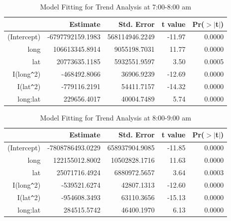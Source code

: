 \documentclass[hidelinks,12pt]{article}
\begin{document}
	\begin{table}[!ht]
		\centering
		\caption{Model Fitting for Trend Analysis at 7:00-8:00 am \label{tbl:trend7}}
		\begin{tabular}{rrrrr}
			\hline
			& Estimate & Std. Error & t value & Pr($>$$|$t$|$) \\ 
			\hline
			(Intercept) & -6797792159.1983 & 568114946.2249 & -11.97 & 0.0000 \\ 
			long & 106613345.8914 & 9055198.7031 & 11.77 & 0.0000 \\ 
			lat & 20773635.1185 & 5932551.9597 & 3.50 & 0.0005 \\ 
			I(long\verb|^|2) & -468492.8066 & 36906.9239 & -12.69 & 0.0000 \\ 
			I(lat\verb|^|2) & -779116.2191 & 54411.7157 & -14.32 & 0.0000 \\ 
			long:lat & 229656.4017 & 40004.7489 & 5.74 & 0.0000 \\ 
			\hline
		\end{tabular}
	\end{table}
	\begin{table}[!ht]
		\centering
		\caption{Model Fitting for Trend Analysis at 8:00-9:00 am \label{tbl:trend8}}
		\begin{tabular}{rrrrr}
			\hline
			& Estimate & Std. Error & t value & Pr($>$$|$t$|$) \\ 
			\hline
			(Intercept) & -7808786493.0229 & 658937904.9085 & -11.85 & 0.0000 \\ 
			long & 122155012.8002 & 10502828.1716 & 11.63 & 0.0000 \\ 
			lat & 25071716.4924 & 6880972.5657 & 3.64 & 0.0003 \\ 
			I(long\verb|^|2) & -539521.6274 & 42807.1313 & -12.60 & 0.0000 \\ 
			I(lat\verb|^|2) & -954608.3493 & 63110.3656 & -15.13 & 0.0000 \\ 
			long:lat & 284515.5742 & 46400.1970 & 6.13 & 0.0000 \\ 
			\hline
		\end{tabular}
	\end{table}
\end{document}
